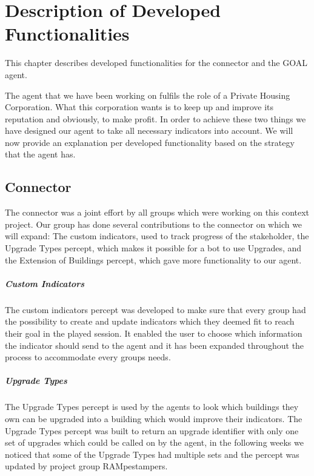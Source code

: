 \chapter[Description of Developed Functionalities]{Description of Developed \\ Functionalities}
This chapter describes developed functionalities for the connector and the GOAL agent.

The agent that we have been working on fulfils the role of a Private Housing Corporation. What this corporation wants is to keep up and improve its reputation and obviously, to make profit. In order to achieve these two things we have designed our agent to take all necessary indicators into account. We will now provide an explanation per developed functionality based on the strategy that the agent has.

\section{Connector} 
The connector was a joint effort by all groups which were working on this context project. Our group has done several contributions to the connector on which we will expand: The custom indicators, used to track progress of the stakeholder, the Upgrade Types percept, which makes it possible for a bot to use Upgrades, and the Extension of Buildings percept, which gave more functionality to our agent.

\paragraph{Custom Indicators}
The custom indicators percept was developed to make sure that every group had the possibility to create and update indicators which they deemed fit to reach their goal in the played session. It enabled the user to choose which information the indicator should send to the agent and it has been expanded throughout the process to accommodate every groups needs.

\paragraph{Upgrade Types}
The Upgrade Types percept is used by the agents to look which buildings they own can be upgraded into a building which would improve their indicators. The Upgrade Types percept was built to return an upgrade identifier with only one set of upgrades which could be called on by the agent, in the following weeks we noticed that some of the Upgrade Types had multiple sets and the percept was updated by project group RAMpestampers.

